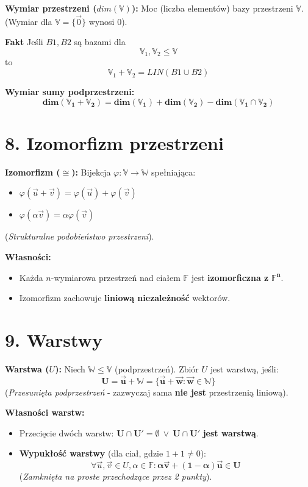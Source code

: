 \documentclass[12pt,a4paper]{article}
\begin{document}
\noindent\textbf{Wymiar przestrzeni ($dim(\mathbb{V})$):} Moc (liczba elementów) bazy przestrzeni $\mathbb{V}$. (Wymiar dla $\mathbb{V}=\{\vec{0}\}$ wynosi $0$).

\noindent\textbf{Fakt} Jeśli $B1, B2$ są bazami dla $$\mathbb{V}_1, \mathbb{V}_2 \le \mathbb{V}$$ to $$\mathbb{V}_1 + \mathbb{V}_2 = LIN(B1 \cup B2)$$

\noindent\textbf{Wymiar sumy podprzestrzeni:} 
$$ \mathbf{dim(\mathbb{V}_1 + \mathbb{V}_2) = dim(\mathbb{V}_1) + dim(\mathbb{V}_2) - dim(\mathbb{V}_1 \cap \mathbb{V}_2)} $$

\section*{8. Izomorfizm przestrzeni}
\noindent\textbf{Izomorfizm ($\cong$):} Bijekcja $\varphi: \mathbb{V} \to \mathbb{W}$ spełniająca:
\begin{itemize}
    \item $\varphi(\vec{u} + \vec{v}) = \varphi(\vec{u}) + \varphi(\vec{v})$
    \item $\varphi(\alpha\vec{v}) = \alpha\varphi(\vec{v})$
\end{itemize}
(\textit{Strukturalne podobieństwo przestrzeni}).

\noindent\textbf{Własności:}
\begin{itemize}
    \item Każda $n$-wymiarowa przestrzeń nad ciałem $\mathbb{F}$ jest \textbf{izomorficzna z} $\mathbf{\mathbb{F}^n}$.
    \item Izomorfizm zachowuje \textbf{liniową niezależność} wektorów.
\end{itemize}

\section*{9. Warstwy}
\noindent\textbf{Warstwa ($U$):} Niech $\mathbb{W} \le \mathbb{V}$ (podprzestrzeń). Zbiór $U$ jest warstwą, jeśli:
$$ \mathbf{U = \vec{u} + \mathbb{W} = \{\vec{u} + \vec{w} : \vec{w} \in \mathbb{W}\}} $$
(\textit{Przesunięta podprzestrzeń} - zazwyczaj sama \textbf{nie jest} przestrzenią liniową).

\noindent\textbf{Własności warstw:}
\begin{itemize}
    \item Przecięcie dwóch warstw: $\mathbf{U \cap U' = \emptyset \ \lor \ U \cap U'}$ \textbf{jest warstwą}.
    \item \textbf{Wypukłość warstwy} (dla ciał, gdzie $1+1 \neq 0$):
    $$ \forall \vec{u}, \vec{v} \in U, \alpha \in \mathbb{F}: \mathbf{\alpha\vec{v} + (1-\alpha)\vec{u} \in U} $$
    (\textit{Zamknięta na proste przechodzące przez 2 punkty}).
\end{itemize}
\end{document}

